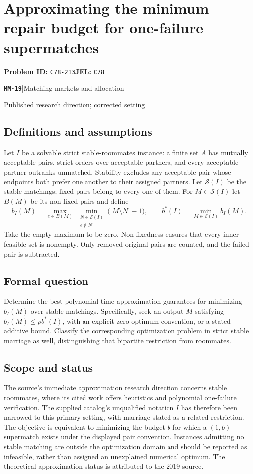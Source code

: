 \documentclass[11pt,a4paper]{article}
\newcommand{\entrymeta}[3]{{\sffamily\small\color{muted}\textbf{\texttt{#1}}\quad|\quad #2\par #3\par}}
\begin{document}
\section*{Approximating the minimum repair budget for one-failure supermatches}
\textbf{Problem ID:} \texttt{C78-213}\quad \textbf{JEL:} \texttt{C78}\par
\label{problem:OP-0560}
\label{beyond:MM-19}
\entrymeta{MM-19}{Matching markets and allocation}{Published research direction; corrected setting}
\subsection*{Definitions and assumptions}
Let $I$ be a solvable strict stable-roommates instance: a finite set $A$ has mutually acceptable pairs, strict orders over acceptable partners, and every acceptable partner outranks unmatched. Stability excludes any acceptable pair whose endpoints both prefer one another to their assigned partners. Let $\mathcal S(I)$ be the stable matchings; fixed pairs belong to every one of them. For $M\in\mathcal S(I)$ let $B(M)$ be its non-fixed pairs and define
\[
 b_I(M)=\max_{e\in B(M)}\ 
 \min_{\substack{N\in\mathcal S(I)\\e\notin N}}
 \bigl(|M\setminus N|-1\bigr),\qquad
 b^*(I)=\min_{M\in\mathcal S(I)}b_I(M).
\]
Take the empty maximum to be zero. Non-fixedness ensures that every inner feasible set is nonempty. Only removed original pairs are counted, and the failed pair is subtracted.
\subsection*{Formal question}
Determine the best polynomial-time approximation guarantees for minimizing $b_I(M)$ over stable matchings. Specifically, seek an output $M$ satisfying $b_I(M)\le\rho b^*(I)$, with an explicit zero-optimum convention, or a stated additive bound. Classify the corresponding optimization problem in strict stable marriage as well, distinguishing that bipartite restriction from roommates.
\subsection*{Scope and status}
The source's immediate approximation research direction concerns stable roommates, where its cited work offers heuristics and polynomial one-failure verification. The supplied catalog's unqualified notation $I$ has therefore been narrowed to this primary setting, with marriage stated as a related restriction. The objective is equivalent to minimizing the budget $b$ for which a $(1,b)$-supermatch exists under the displayed pair convention. Instances admitting no stable matching are outside the optimization domain and should be reported as infeasible, rather than assigned an unexplained numerical optimum. The theoretical approximation status is attributed to the 2019 source.
\end{document}
